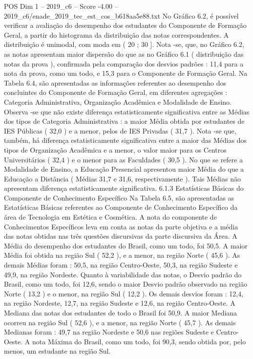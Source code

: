 \begin{textsample}{POS Dim 1 – 2019\_c6 – Score -4.00 – 2019\_c6/enade\_2019\_tec\_est\_cos\_b618aa5e88.txt}
No Gráfico 6.2, é possível verificar a avaliação do desempenho dos estudantes do Componente de Formação Geral, a partir do histograma da distribuição das notas correspondentes.
A distribuição é unimodal, com moda em ( 20 ; 30 ].
Nota -se, que, no Gráfico 6.2, as notas apresentam maior dispersão do que as no Gráfico 6.1 ( distribuição das notas da prova ), confirmada pela comparação dos desvios padrões : 11,4 para a nota da prova, como um todo, e 15,3 para o Componente de Formação Geral.
Na Tabela 6.4, são apresentadas as informações referentes ao desempenho dos concluintes do Componente de Formação Geral, em diferentes agregações : Categoria Administrativa, Organização Acadêmica e Modalidade de Ensino.
Observa -se que não existe diferença estatisticamente significativa entre as Médias dos tipos de Categoria Administrativa : a maior Média obtida por estudantes de IES Públicas ( 32,0 ) e a menor, pelos de IES Privadas ( 31,7 ).
Nota -se que, também, há diferença estatisticamente significativa entre a maior das Médias dos tipos de Organização Acadêmica e a menor, o valor maior para os Centros Universitários ( 32,4 ) e o menor para as Faculdades ( 30,5 ).
No que se refere a Modalidade de Ensino, a Educação Presencial apresentou maior Média do que a Educação a Distância ( Médias 31,7 e 31,6, respectivamente ).
Tais Médias não apresentam diferença estatisticamente significativa. 6.1.3 Estatísticas Básicas do Componente de Conhecimento Específico Na Tabela 6.5, são apresentadas as Estatísticas Básicas referentes ao Componente de Conhecimento Específico da área de Tecnologia em Estética e Cosmética.
A nota do componente de Conhecimentos Específicos leva em conta as notas da parte objetiva e a média das notas obtidas nas três questões discursivas da parte discursiva da Área.
A Média do desempenho dos estudantes do Brasil, como um todo, foi 50,5.
A maior Média foi obtida na região Sul ( 52,2 ), e a menor, na região Norte ( 45,6 ).
As demais Médias foram : 50,5, na região Centro-Oeste, 50,3, na região Sudeste e 49,9, na região Nordeste.
Quanto à variabilidade das notas, o Desvio padrão do Brasil, como um todo, foi 12,6, sendo o maior Desvio padrão observado na região Norte ( 13,2 ) e o menor, na região Sul ( 12,2 ).
Os demais desvios foram : 12,4, na região Nordeste, 12,7, na região Sudeste e 12,6, na região Centro-Oeste.
A Mediana das notas dos estudantes de todo o Brasil foi 50,9.
A maior Mediana ocorreu na região Sul ( 52,6 ), e a menor, na região Norte ( 45,7 ).
As demais Medianas foram : 49,7 na região Nordeste e 50,6 nas regiões Sudeste e Centro-Oeste.
A nota Máxima do Brasil, como um todo, foi 90,3, sendo obtida por, pelo menos, um estudante na região Sul.

\end{textsample}
